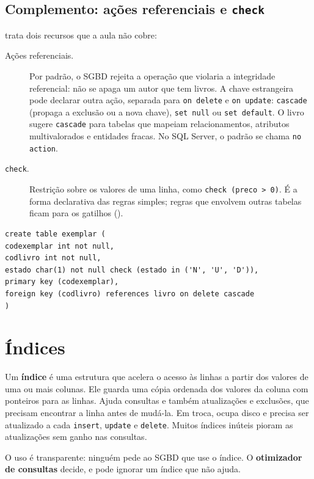 \subsection*{Complemento: ações referenciais e \texttt{check}}

\textcite[seção 4.2]{Elmasri2011} trata dois recursos que a aula não
cobre:

\begin{description}
	\item[Ações referenciais.] Por padrão, o SGBD rejeita a operação que
	violaria a integridade referencial: não se apaga um autor que tem
	livros. A chave estrangeira pode declarar outra ação, separada para
	\texttt{on delete} e \texttt{on update}: \texttt{cascade} (propaga a
	exclusão ou a nova chave), \texttt{set null} ou \texttt{set default}.
	O livro sugere \texttt{cascade} para tabelas que mapeiam
	relacionamentos, atributos multivalorados e entidades fracas. No SQL
	Server, o padrão se chama \texttt{no action}.
	\item[\texttt{check}.] Restrição sobre os valores de uma linha, como
	\texttt{check (preco > 0)}. É a forma declarativa das regras
	simples; regras que envolvem outras tabelas ficam para os gatilhos
	().
\end{description}

\begin{lstlisting}
create table exemplar (
codexemplar int not null,
codlivro int not null,
estado char(1) not null check (estado in ('N', 'U', 'D')),
primary key (codexemplar),
foreign key (codlivro) references livro on delete cascade
)
\end{lstlisting}

\section{Índices}

Um \textbf{índice} é uma estrutura que acelera o acesso às
linhas a partir dos valores de uma ou mais colunas. Ele guarda uma
cópia ordenada dos valores da coluna com ponteiros para as linhas.
Ajuda consultas e também atualizações e exclusões, que precisam
encontrar a linha antes de mudá-la. Em troca, ocupa disco e precisa ser
atualizado a cada \texttt{insert}, \texttt{update} e \texttt{delete}.
Muitos índices inúteis pioram as atualizações sem ganho nas consultas.

O uso é transparente: ninguém pede ao SGBD que use o índice. O
\textbf{otimizador de consultas} decide, e pode ignorar um índice que
não ajuda.

